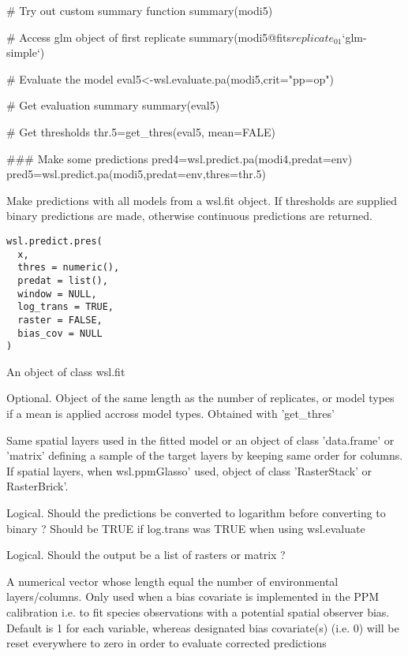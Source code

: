 \documentclass[a4paper]{book}
\begin{document}
\begin{Examples}
\begin{ExampleCode}
# Try out custom summary function
summary(modi5)

# Access glm object of first replicate
summary(modi5@fits$replicate_01$`glm-simple`)

# Evaluate the model
eval5<-wsl.evaluate.pa(modi5,crit="pp=op")

# Get evaluation summary
summary(eval5)

# Get thresholds
thr.5=get_thres(eval5, mean=FALE)

### Make some predictions
pred4=wsl.predict.pa(modi4,predat=env)
pred5=wsl.predict.pa(modi5,predat=env,thres=thr.5)

\end{ExampleCode}
\end{Examples}
%
\begin{Description}\relax
Make predictions with all models from a wsl.fit object. If thresholds are supplied
binary predictions are made, otherwise continuous predictions are returned.
\end{Description}
%
\begin{Usage}
\begin{verbatim}
wsl.predict.pres(
  x,
  thres = numeric(),
  predat = list(),
  window = NULL,
  log_trans = TRUE,
  raster = FALSE,
  bias_cov = NULL
)
\end{verbatim}
\end{Usage}
%
\begin{Arguments}
\begin{ldescription}
\item[\code{x}] An object of class wsl.fit

\item[\code{thres}] Optional. Object of the same length as the number of replicates, or model
types if a mean is applied accross model types. Obtained with 'get\_thres'

\item[\code{predat}] Same spatial layers used in the fitted model or an object of class 'data.frame' or 
'matrix' defining a sample of the target layers by keeping same order for columns. If spatial layers,
when wsl.ppmGlasso' used, object of class 'RasterStack' or RasterBrick'.

\item[\code{log\_trans}] Logical. Should the predictions be converted to logarithm before converting to binary ?
Should be TRUE if log.trans was TRUE when using wsl.evaluate

\item[\code{raster}] Logical. Should the output be a list of rasters or matrix ?

\item[\code{bias\_cov}] A numerical vector whose length equal the number of environmental layers/columns.
Only used when a bias covariate is implemented in the PPM calibration i.e. to fit species observations with
a potential spatial observer bias. Default is 1 for each variable, whereas designated bias covariate(s)
(i.e. 0) will be reset everywhere to zero in order to evaluate corrected predictions
\end{ldescription}
\end{Arguments}
\end{document}
